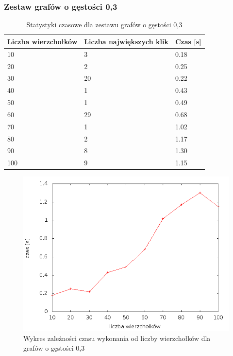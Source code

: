 \documentclass[12pt, a4paper]{article}
\begin{document}
\subsubsection*{Zestaw grafów o gęstości 0,3}
\begin{table}[H]
\caption{Statystyki czasowe dla zestawu grafów o gęstości 0,3}
\begin{center}
    \begin{tabular}{|l|l|l|}
    \hline
    Liczba wierzchołków & Liczba największych klik & Czas [s] \\ \hline
    10 & 3 & 0.18 \\ \hline
    20 & 2 & 0.25 \\ \hline
    30 & 20 & 0.22 \\ \hline
    40 & 1 & 0.43 \\ \hline
    50 & 1 & 0.49 \\ \hline
    60 & 29 & 0.68 \\ \hline
    70 & 1 & 1.02 \\ \hline
    80 & 2 & 1.17 \\ \hline
    90 & 8 & 1.30 \\ \hline
    100 & 9 & 1.15 \\ \hline
    \end{tabular}
\end{center}
\end{table}

\begin{figure}[h]
    \begin{center}
	\includegraphics[scale=0.5]{../experiment_1/img/den/den_03.png}
	\caption{Wykres zależności czasu wykonania od liczby wierzchołków dla grafów o gęstości 0,3}
    \end{center}
\end{figure}
\end{document}
